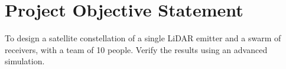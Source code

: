\section{Project Objective Statement}
\label{dsePPPOS}
To design a satellite constellation of a single LiDAR emitter and a swarm of receivers, with a team of 10 people. Verify the results using an advanced simulation.